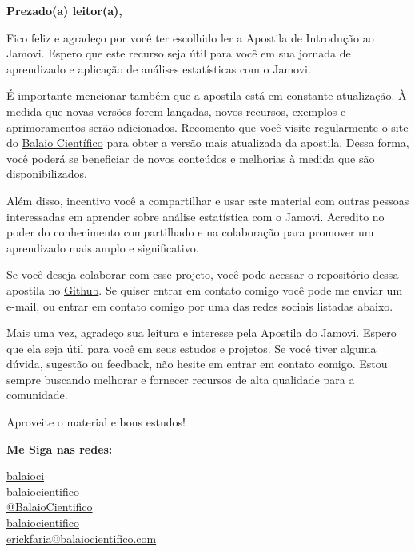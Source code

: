 
\begin{flushleft}
\Huge\textbf{Prezado(a) leitor(a),}
\end{flushleft}

Fico feliz e agradeço por você ter escolhido ler a Apostila de Introdução ao Jamovi. Espero que este recurso seja útil para você em sua jornada de aprendizado e aplicação de análises estatísticas com o Jamovi.

É importante mencionar também que a apostila está em constante atualização. À medida que novas versões forem lançadas, novos recursos, exemplos e aprimoramentos serão adicionados. Recomento que você visite regularmente o site do \href{https://www.balaiocientifico.com/jamovi/apostila-de-jamovi/?utm_source=apostila_jamovi&utm_medium=pdf} {Balaio Científico} para obter a versão mais atualizada da apostila. Dessa forma, você poderá se beneficiar de novos conteúdos e melhorias à medida que são disponibilizados.

Além disso, incentivo você a compartilhar e usar este material com outras pessoas interessadas em aprender sobre análise estatística com o Jamovi. Acredito no poder do conhecimento compartilhado e na colaboração para promover um aprendizado mais amplo e significativo.

Se você deseja colaborar com esse projeto, você pode acessar o repositório dessa apostila no \href{https://github.com/balaio-cientifico/apostila_jamovi}{Github}. Se quiser entrar em contato comigo você pode me enviar um e-mail, ou entrar em contato comigo por uma das redes sociais listadas abaixo.

Mais uma vez, agradeço sua leitura e interesse pela Apostila do Jamovi. Espero que ela seja útil para você em seus estudos e projetos. Se você tiver alguma dúvida, sugestão ou feedback, não hesite em entrar em contato comigo. Estou sempre buscando melhorar e fornecer recursos de alta qualidade para a comunidade.

Aproveite o material e bons estudos!

\vfill

\noindent \textbf{Me Siga nas redes:}

\noindent \faTwitter{} \href{https://twitter.com/balaioci}{balaioci} \\
\faFacebook{} \href{https://www.facebook.com/balaiocientifico/}{balaiocientifico} \\
\faYoutube{} \href{https://www.youtube.com/@BalaioCientifico}{@BalaioCientifico} \\
\faInstagram{} \href{https://www.instagram.com/balaiocientifico/}{balaiocientifico} \\
\faEnvelope{} \href{mailto:contato@balaiocientifico.com}{erickfaria@balaiocientifico.com}\\

